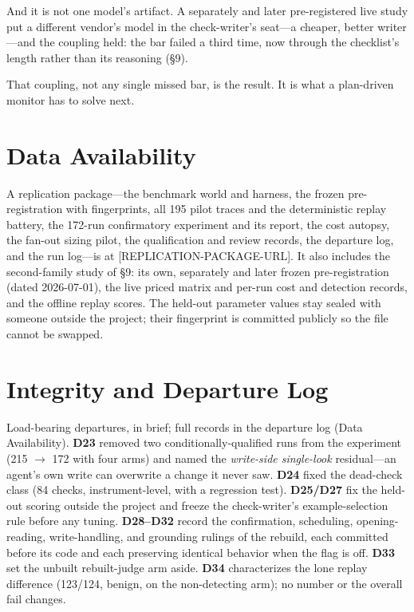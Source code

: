 \documentclass[acmsmall,screen]{acmart}
\begin{document}
And it is not one model's artifact. A separately and later pre-registered live
study put a different vendor's model in the check-writer's seat---a cheaper,
better writer---and the coupling held: the bar failed a third time, now through
the checklist's length rather than its reasoning (\S9).

That coupling, not any single missed bar, is the result. It is what a
plan-driven monitor has to solve next.

\section*{Data Availability}
A replication package---the benchmark world and harness, the frozen
pre-registration with fingerprints, all 195 pilot traces and the deterministic
replay battery, the 172-run confirmatory experiment and its report, the cost
autopsy, the fan-out sizing pilot, the qualification and review records, the
departure log, and the run log---is at [REPLICATION-PACKAGE-URL]. It also includes
the second-family study of \S9: its own, separately and later frozen
pre-registration (dated 2026-07-01), the live priced matrix and per-run cost and
detection records, and the offline replay scores. The held-out parameter values
stay sealed with someone outside the project; their fingerprint is committed
publicly so the file cannot be swapped.

\appendix

\section{Integrity and Departure Log}
Load-bearing departures, in brief; full records in the departure log (Data
Availability). \textbf{D23} removed two conditionally-qualified runs from the
experiment (215 $\rightarrow$ 172 with four arms) and named the \emph{write-side
single-look} residual---an agent's own write can overwrite a change it never
saw. \textbf{D24} fixed the dead-check class (84 checks, instrument-level, with a
regression test). \textbf{D25/D27} fix the held-out scoring outside the project
and freeze the check-writer's example-selection rule before any tuning.
\textbf{D28--D32} record the confirmation, scheduling, opening-reading,
write-handling, and grounding rulings of the rebuild, each committed before its
code and each preserving identical behavior when the flag is off. \textbf{D33}
set the unbuilt rebuilt-judge arm aside. \textbf{D34} characterizes the lone
replay difference (123/124, benign, on the non-detecting arm); no number or the
overall fail changes.
\end{document}
